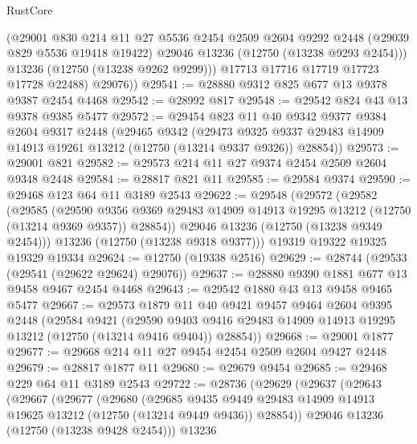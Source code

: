 \begin{lexlean}{RustCore}
\begin{coremodule}
            (@29001
              @830
              @214
              @11
              @27
              @5536
              @2454
              @2509
              @2604
              @9292
              @2448
              (@29039 @829 @5536 @19418 @19422)
              @29046
              @13236
              (@12750 (@13238 @9293 @2454)))
            @13236
            (@12750 (@13238 @9262 @9299)))
          @17713
          @17716
          @17719
          @17723
          @17728
          @22488)
        @29076))
@29541 := @28880 @9312 @825 @677 @13 @9378 @9387 @2454 @4468
@29542 := @28992 @817
@29548 := @29542 @824 @43 @13 @9378 @9385 @5477
@29572 := @29454
    @823
    @11
    @40
    @9342
    @9377
    @9384
    @2604
    @9317
    @2448
    (@29465
      @9342
      (@29473 @9325 @9337 @29483 @14909 @14913 @19261 @13212 (@12750 (@13214 @9337 @9326)) @28854))
@29573 := @29001 @821
@29582 := @29573 @214 @11 @27 @9374 @2454 @2509 @2604 @9348 @2448
@29584 := @28817 @821 @11
@29585 := @29584 @9374
@29590 := @29468 @123 @64 @11 @3189 @2543
@29622 := @29548
    (@29572
      (@29582
        (@29585
          (@29590
            @9356
            @9369
            @29483
            @14909
            @14913
            @19295
            @13212
            (@12750 (@13214 @9369 @9357))
            @28854))
        @29046
        @13236
        (@12750 (@13238 @9349 @2454)))
      @13236
      (@12750 (@13238 @9318 @9377)))
    @19319
    @19322
    @19325
    @19329
    @19334
@29624 := @12750 (@19338 @2516)
@29629 := @28744 (@29533 (@29541 (@29622 @29624) @29076))
@29637 := @28880 @9390 @1881 @677 @13 @9458 @9467 @2454 @4468
@29643 := @29542 @1880 @43 @13 @9458 @9465 @5477
@29667 := @29573
    @1879
    @11
    @40
    @9421
    @9457
    @9464
    @2604
    @9395
    @2448
    (@29584
      @9421
      (@29590 @9403 @9416 @29483 @14909 @14913 @19295 @13212 (@12750 (@13214 @9416 @9404)) @28854))
@29668 := @29001 @1877
@29677 := @29668 @214 @11 @27 @9454 @2454 @2509 @2604 @9427 @2448
@29679 := @28817 @1877 @11
@29680 := @29679 @9454
@29685 := @29468 @229 @64 @11 @3189 @2543
@29722 := @28736
    (@29629
      (@29637
        (@29643
          (@29667
            (@29677
              (@29680
                (@29685
                  @9435
                  @9449
                  @29483
                  @14909
                  @14913
                  @19625
                  @13212
                  (@12750 (@13214 @9449 @9436))
                  @28854))
              @29046
              @13236
              (@12750 (@13238 @9428 @2454)))
            @13236

\end{coremodule}
\end{lexlean}
